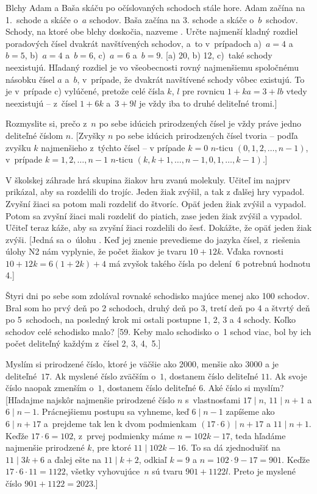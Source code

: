 {Blchy Adam a Baša skáču po očíslovaných schodoch stále hore.
Adam začína na 1.~schode a skáče o~$a$ schodov. Baša
začína na 3. schode a skáče o~$b$~schodov. Schody, na ktoré obe
blchy doskočia, nazveme . Určte najmenší
kladný rozdiel poradových čísel dvakrát navštívených schodov,
a~to v~prípadoch a)~$a=4$ a~$b=5$,
b)~$a=4$ a~$b=6$, c)~$a=6$ a~$b=9$.
[a) 20, b) 12, c)~také schody neexistujú.
Hľadaný rozdiel je vo všeobecnosti rovný
najmenšiemu spoločnému násobku čísel $a$ a~$b$, v~prípade, že dvakrát navštívené schody vôbec existujú.
To je v~prípade c) vylúčené, pretože celé čísla $k$, $l$
pre rovnicu $1+ka=3+lb$ vtedy neexistujú -- z~čísel
$1+6k$ a~$3+9l$ je vždy iba to druhé deliteľné tromi.]

\D
Rozmyslite si, prečo z~$n$ po sebe idúcich prirodzených
čísel je vždy práve jedno deliteľné číslom $n$.
[Zvyšky $n$ po sebe idúcich prirodzených čísel tvoria -- podľa
zvyšku $k$ najmenšieho z~týchto čísel -- v prípade $k=0$
$n$-ticu $(0,1,2,\ldots,n-1)$, v~prípade $k=1,2,\dots,n-1$
$n$-ticu $(k,k+1,\dots,n-1,0,1,\dots,k-1)$.]

V školskej záhrade hrá skupina žiakov hru zvanú molekuly. Učiteľ im najprv prikázal, aby sa rozdelili do trojíc.
Jeden žiak zvýšil, a tak z ďalšej hry vypadol. Zvyšní žiaci sa potom mali rozdeliť do štvoríc. Opäť jeden žiak zvýšil
a vypadol. Potom sa zvyšní žiaci mali rozdeliť do piatich, zase jeden žiak zvýšil a vypadol. Učiteľ teraz káže, aby
sa zvyšní žiaci rozdelili do šesť. Dokážte, že opäť jeden žiak zvýši.
[Jedná sa o~úlohu . Keď jej znenie prevedieme
do jazyka čísel, z~riešenia úlohy N2 nám vyplynie, že počet žiakov je tvaru
$10 + 12k$. Vďaka rovnosti $10+12k=6(1+2k)+4$ má zvyšok
takého čísla po delení~$6$ potrebnú hodnotu 4.]

Štyri dni po sebe som zdolával rovnaké schodisko majúce menej ako 100
schodov. Bral som ho prvý deň po 2 schodoch, druhý deň po 3,
tretí deň po 4 a štvrtý deň po 5~schodoch, na posledný krok mi ostali
postupne 1, 2, 3 a 4 schody. Koľko schodov celé schodisko malo?
[59. Keby malo schodisko o~1 schod viac, bol by ich počet
deliteľný každým z~čísel 2, 3, 4,~5.]

Myslím si prirodzené číslo, ktoré je väčšie ako 2000, menšie
ako 3000 a je deliteľné~$17$.
Ak myslené číslo zväčším o~$1$,
dostanem číslo deliteľné $11$. Ak svoje číslo naopak zmenším o~$1$,
dostanem číslo deliteľné $6$. Aké číslo si myslím?
[Hľadajme najskôr najmenšie prirodzené číslo $n$
s~vlastnosťami $17\mid n$, $11\mid n+1$ a $6\mid n-1$.
Prácnejšiemu postupu sa vyhneme, keď
$6\mid n-1$ zapíšeme ako $6\mid n+17$ a~prejdeme tak len k dvom
podmienkam $(17\cdot6)\mid n+17$ a $11\mid n+1$. Keďže
$17\cdot6=102$, z~prvej podmienky máme $n=102k-17$, teda hľadáme
najmenšie prirodzené $k$, pre ktoré $11\mid 102k-16$.
To sa dá zjednodušiť na $11\mid 3k+6$
a ďalej ešte na $11\mid k+2$, odkiaľ $k=9$ a $n=102\cdot9-17=901$.
Keďže $17\cdot6\cdot11=1122$, všetky vyhovujúce~$n$ sú tvaru
$901+1122l$. Preto je myslené číslo $901+1122=2023$.]

}
